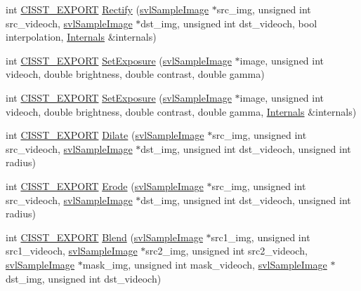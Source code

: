 \begin{DoxyCompactItemize}
\item 
int \hyperlink{cmn_export_macros_8h_a99393e0c3ac434b2605235bbe20684f8}{C\-I\-S\-S\-T\-\_\-\-E\-X\-P\-O\-R\-T} \hyperlink{namespacesvl_image_processing_aae74cfc118a2828f66163464fd418274}{Rectify} (\hyperlink{classsvl_sample_image}{svl\-Sample\-Image} $\ast$src\-\_\-img, unsigned int src\-\_\-videoch, \hyperlink{classsvl_sample_image}{svl\-Sample\-Image} $\ast$dst\-\_\-img, unsigned int dst\-\_\-videoch, bool interpolation, \hyperlink{classsvl_image_processing_1_1_internals}{Internals} \&internals)
\item 
int \hyperlink{cmn_export_macros_8h_a99393e0c3ac434b2605235bbe20684f8}{C\-I\-S\-S\-T\-\_\-\-E\-X\-P\-O\-R\-T} \hyperlink{namespacesvl_image_processing_ac0f716d58a6015a9648836a883e1fb32}{Set\-Exposure} (\hyperlink{classsvl_sample_image}{svl\-Sample\-Image} $\ast$image, unsigned int videoch, double brightness, double contrast, double gamma)
\item 
int \hyperlink{cmn_export_macros_8h_a99393e0c3ac434b2605235bbe20684f8}{C\-I\-S\-S\-T\-\_\-\-E\-X\-P\-O\-R\-T} \hyperlink{namespacesvl_image_processing_ae8acb9198b94108a07bbf0579316658f}{Set\-Exposure} (\hyperlink{classsvl_sample_image}{svl\-Sample\-Image} $\ast$image, unsigned int videoch, double brightness, double contrast, double gamma, \hyperlink{classsvl_image_processing_1_1_internals}{Internals} \&internals)
\item 
int \hyperlink{cmn_export_macros_8h_a99393e0c3ac434b2605235bbe20684f8}{C\-I\-S\-S\-T\-\_\-\-E\-X\-P\-O\-R\-T} \hyperlink{namespacesvl_image_processing_aaac2f4f8efbbb642c2957d91d54a2fac}{Dilate} (\hyperlink{classsvl_sample_image}{svl\-Sample\-Image} $\ast$src\-\_\-img, unsigned int src\-\_\-videoch, \hyperlink{classsvl_sample_image}{svl\-Sample\-Image} $\ast$dst\-\_\-img, unsigned int dst\-\_\-videoch, unsigned int radius)
\item 
int \hyperlink{cmn_export_macros_8h_a99393e0c3ac434b2605235bbe20684f8}{C\-I\-S\-S\-T\-\_\-\-E\-X\-P\-O\-R\-T} \hyperlink{namespacesvl_image_processing_abaa033a40ea75268ed95876ba061a7b5}{Erode} (\hyperlink{classsvl_sample_image}{svl\-Sample\-Image} $\ast$src\-\_\-img, unsigned int src\-\_\-videoch, \hyperlink{classsvl_sample_image}{svl\-Sample\-Image} $\ast$dst\-\_\-img, unsigned int dst\-\_\-videoch, unsigned int radius)
\item 
int \hyperlink{cmn_export_macros_8h_a99393e0c3ac434b2605235bbe20684f8}{C\-I\-S\-S\-T\-\_\-\-E\-X\-P\-O\-R\-T} \hyperlink{namespacesvl_image_processing_adbdd2812201b8085d9f4a37cdd2858a7}{Blend} (\hyperlink{classsvl_sample_image}{svl\-Sample\-Image} $\ast$src1\-\_\-img, unsigned int src1\-\_\-videoch, \hyperlink{classsvl_sample_image}{svl\-Sample\-Image} $\ast$src2\-\_\-img, unsigned int src2\-\_\-videoch, \hyperlink{classsvl_sample_image}{svl\-Sample\-Image} $\ast$mask\-\_\-img, unsigned int mask\-\_\-videoch, \hyperlink{classsvl_sample_image}{svl\-Sample\-Image} $\ast$dst\-\_\-img, unsigned int dst\-\_\-videoch)

\end{DoxyCompactItemize}
